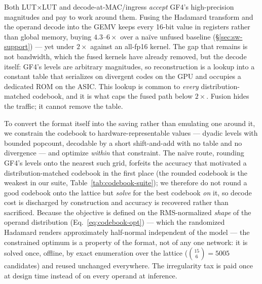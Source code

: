 %
%

Both LUT$\times$LUT and decode-at-MAC/ingress \emph{accept} GF4's high-precision
magnitudes and pay to work around them. Fusing the Hadamard transform and the
operand decode into the GEMV keeps every 16-bit value in registers rather than
global memory, buying $4.3$--$6\times$ over a na\"ive unfused baseline
(\S\ref{sec:sw-support}) --- yet under $2\times$ against an all-fp16 kernel. The
gap that remains is not bandwidth, which the fused kernels have already removed,
but the decode itself: GF4's levels are arbitrary magnitudes, so reconstruction
is a lookup into a constant table that serializes on divergent codes on the GPU
and occupies a dedicated ROM on the ASIC. This lookup is common to \emph{every}
distribution-matched codebook, and it is what caps the fused path below
$2\times$. Fusion hides the traffic; it cannot remove the table.

To convert the format itself into the saving rather than emulating one around it,
we constrain the codebook to hardware-representable values --- dyadic levels with
bounded popcount, decodable by a short shift-and-add with no table and no
divergence --- and optimize \emph{within} that constraint. The na\"ive route,
rounding GF4's levels onto the nearest such grid, forfeits the accuracy that
motivated a distribution-matched codebook in the first place (the rounded
codebook is the weakest in our suite, Table~\ref{tab:codebook-suite}); we
therefore do not round a good codebook onto the lattice but \emph{solve} for the
best codebook \emph{on} it, so decode cost is discharged by construction and
accuracy is recovered rather than sacrificed. Because the objective is defined on
the RMS-normalized \emph{shape} of the operand distribution
(Eq.~\ref{eq:codebook-opt}) --- which the randomized Hadamard renders
approximately half-normal independent of the model --- the constrained optimum is
a property of the format, not of any one network: it is solved once, offline, by
exact enumeration over the lattice ($\binom{15}{6}=5005$ candidates) and reused
unchanged everywhere. The irregularity tax is paid once at design time instead of
on every operand at inference.
